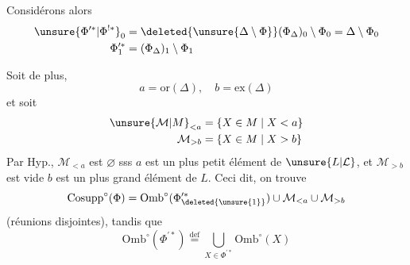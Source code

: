 Considérons alors
\[
\begin{aligned}
\unsure{\Phi^{\prime *}|\Phi^{!*}}_0&=\deleted{\unsure{\Delta\setminus\Phi}}(\Phi_{\Delta})_0\setminus\Phi_0=\Delta\setminus\Phi_0\\
\Phi^{\prime *}_1&=(\Phi_{\Delta})_1\setminus\Phi_1
\end{aligned}
\]

Soit de plus, 
\[
a=\mathrm{or}(\Delta),\quad b=\mathrm{ex}(\Delta)
\]
et soit
\[
\begin{aligned}
\unsure{\mathcal{M}|M}_{<a}&=\{X\in M\mid X<a\}\\
\mathcal{M}_{>b}&=\{X\in M\mid X>b\}
\end{aligned}
\]
Par Hyp., $\mathcal{M}_{<a}$ est $\varnothing$ sss $a$ est un plus petit élément de $\unsure{L|\mathcal{L}}$, et $\mathcal{M}_{>b}$ est vide  $b$ est un plus grand élément de $L$. Ceci dit, on trouve 
\[
\mathrm{Cosupp}^{\circ}(\Phi)=\mathrm{Omb}^{\circ}(\Phi^{\prime *}_{\deleted{\unsure{1}}})\cup\mathcal{M}_{<a}\cup\mathcal{M}_{>b}
\]
(réunions disjointes), tandis que
\[
\mathrm{Omb}^{\circ}(\Phi^{\prime *})\overset{\mathrm{def}}{=}\bigcup_{X\in\Phi^{\prime *}}\mathrm{Omb}^{\circ}(X)
\]
